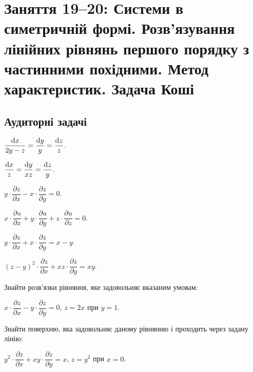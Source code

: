 \section*{Заняття 19--20: Системи в симетричній формі. Розв'язування лінійних рівнянь першого порядку з частинними похідними. Метод характеристик. Задача Коші}

\subsection*{Аудиторні задачі}

\begin{problem}
	$\dfrac{\mathop{}\!\mathrm{d} x}{2 y - z} = \dfrac{\mathop{}\!\mathrm{d} y}{y} = \dfrac{\mathop{}\!\mathrm{d} z}{z}$.
\end{problem}

\begin{problem}
	$\dfrac{\mathop{}\!\mathrm{d} x}{z} = \dfrac{\mathop{}\!\mathrm{d} y}{x z} = \dfrac{\mathop{}\!\mathrm{d} z}{y}$.
\end{problem}

\begin{problem}
	$y \cdot \dfrac{\partial z}{\partial x} - x \cdot \dfrac{\partial z}{\partial y} = 0$.
\end{problem}

\begin{problem}
	$x \cdot \dfrac{\partial u}{\partial x} + y \cdot \dfrac{\partial u}{\partial y} + z \cdot \dfrac{\partial u}{\partial z} = 0$.
\end{problem}

\begin{problem}
	$y \cdot \dfrac{\partial z}{\partial x} + x \cdot \dfrac{\partial z}{\partial y} = x - y$.
\end{problem}

\begin{problem}
	$(z - y)^2 \cdot \dfrac{\partial z}{\partial x} + x z \cdot \dfrac{\partial z}{\partial y} = x y$.
\end{problem}

Знайти розв'язки рівняння, яке задовольняє вказаним умовам:

\begin{problem}
	$x \cdot \dfrac{\partial z}{\partial x} - y \cdot \dfrac{\partial z}{\partial y} = 0$, $z = 2 x$ при $y = 1$.
\end{problem}

Знайти поверхню, яка задовольняє даному рівнянню і проходить через задану лінію:

\begin{problem}
	$y^2 \cdot \dfrac{\partial z}{\partial x} + x y \cdot \dfrac{\partial z}{\partial y} = x$, $z = y^2$ при $x = 0$.
\end{problem}

